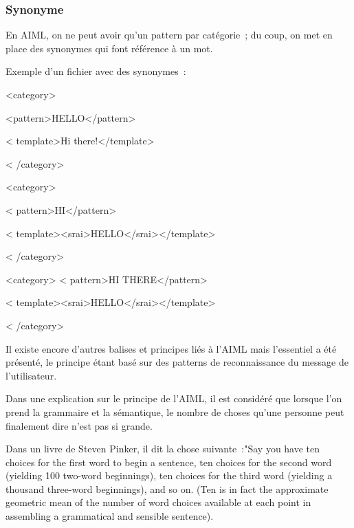 \subsubsection{Synonyme}

En AIML, on ne peut avoir qu’un pattern par catégorie ;  du coup, on met en place des synonymes qui font référence à un mot.
\vspace{1em}

Exemple d’un fichier avec des synonymes :
\vspace{1em}

<category>
\vspace{0.1em}

<pattern>HELLO</pattern>
\vspace{0.1em}

< template>Hi there!</template>
\vspace{0.1em}

< /category>
\vspace{0.1em}

<category>
\vspace{0.1em}

< pattern>HI</pattern>
\vspace{0.1em}

< template><srai>HELLO</srai></template>
\vspace{0.1em}

< /category>
\vspace{0.1em}

<category>
\vspace{0.1em}
< pattern>HI THERE</pattern>
\vspace{0.1em}

< template><srai>HELLO</srai></template>
\vspace{0.1em}

< /category>
\vspace{1em}

	Il existe encore d’autres balises et principes liés à l’AIML mais l’essentiel a été présenté, le principe étant basé sur des patterns de reconnaissance du message de l’utilisateur.
\vspace{1em}

	Dans une explication sur le principe de l’AIML, il est considéré que lorsque l’on prend la grammaire et la sémantique, le nombre de choses qu’une personne peut finalement dire n’est pas si grande.
	\vspace{1em}
	
	Dans un livre de Steven Pinker, il dit la chose suivante :"Say you have ten choices for the first word to begin a sentence, ten choices for the second word (yielding 100 two-word beginnings), ten choices for the third word (yielding a thousand three-word beginnings), and so on. (Ten is in fact the approximate geometric mean of the number of word choices available at each point in assembling a grammatical and sensible sentence). \cite{ref13}

